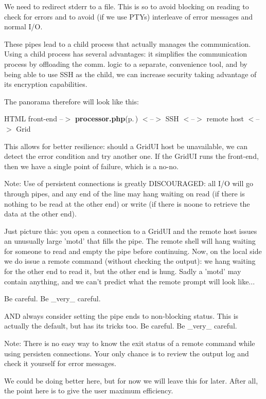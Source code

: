 We need to redirect stderr to a file. This is so to avoid blocking on reading to check for errors and to avoid (if we use PTYs) interleave of error messages and normal I/O.

These pipes lead to a child process that actually manages the communication. Using a child process has several advantages: it simplifies the communication process by offloading the comm. logic to a separate, convenience tool, and by being able to use SSH as the child, we can increase security taking advantage of its encryption capabilities.

The panorama therefore will look like this:

HTML front-end --$>$ {\bf processor.php}{\rm (p.\,\pageref{processor_8php})} $<$--$>$ SSH $<$--$>$ remote host $<$--$>$ Grid

This allows for better resilience: should a Grid\-UI host be unavailable, we can detect the error condition and try another one. If the Grid\-UI runs the front-end, then we have a single point of failure, which is a no-no.

\begin{Desc}
\item[Note:]Use of persistent connections is greatly DISCOURAGED: all I/O will go through pipes, and any end of the line may hang waiting on read (if there is nothing to be read at the other end) or write (if there is noone to retrieve the data at the other end).\end{Desc}
Just picture this: you open a connection to a Grid\-UI and the remote host issues an unusually large 'motd' that fills the pipe. The remote shell will hang waiting for someone to read and empty the pipe before continuing. Now, on the local side we do issue a remote command (without checking the output): we hang waiting for the other end to read it, but the other end is hung. Sadly a 'motd' may contain anything, and we can't predict what the remote prompt will look like...

Be careful. Be \_\-very\_\- careful.

AND always consider setting the pipe ends to non-blocking status. This is actually the default, but has its tricks too. Be careful. Be \_\-very\_\- careful.

\begin{Desc}
\item[Note:]There is no easy way to know the exit status of a remote command while using persisten connections. Your only chance is to review the output log and check it yourself for error messages.\end{Desc}
We could be doing better here, but for now we will leave this for later. After all, the point here is to give the user maximum efficiency.

